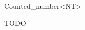 
\begin{ccRefClass} {Counted_number<NT>}
\label{Counted_number}

\ccDefinition

TODO

\end{ccRefClass} 